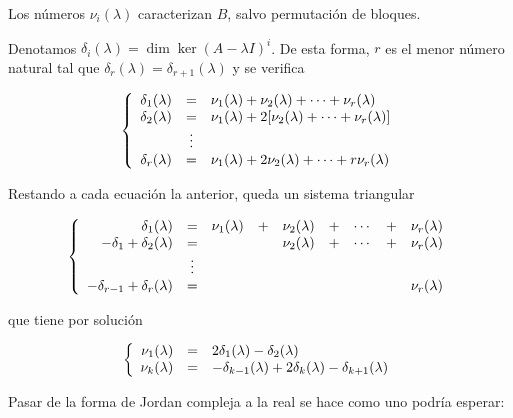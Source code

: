 \documentclass[../main.tex]{subfiles}
\begin{document}
  \begin{remark}
    Los números \(\nu_i(\lambda)\) caracterizan \(B\), salvo permutación de bloques.
  \end{remark}
  
  Denotamos \(\delta_i(\lambda) = \dim \ker (A - \lambda I)^i\). De esta forma,
  \(r\) es el menor número natural tal que \(\delta_r(\lambda) =
  \delta_{r+1}(\lambda)\) y se verifica

  \[\left\{
      \begin{array}[ht]{r c l}
        \delta_1(\lambda) & = & \nu_1(\lambda) + \nu_2(\lambda) + \cdots +
                            \nu_r(\lambda) \\
        \delta_2(\lambda) & = & \nu_1(\lambda) + 2[\nu_2(\lambda) + \cdots +
                            \nu_r(\lambda)] \\
        & \vdots & \\
        \delta_r(\lambda) & = & \nu_1(\lambda) + 2\nu_2(\lambda) + \cdots + r\nu_r(\lambda)
      \end{array}
      \right.
    \]

    Restando a cada ecuación la anterior, queda un sistema triangular

  \[\left\{
      \begin{array}[ht]{r c c c c c c c c}
        \delta_1(\lambda) & = & \nu_1(\lambda) & + & \nu_2(\lambda) & + & \cdots & + & \nu_r(\lambda) \\
        -\delta_1 + \delta_2(\lambda) & = & & & \nu_2(\lambda) & + & \cdots & + & \nu_r(\lambda) \\
        & \vdots & \\
        -\delta_{r-1} + \delta_r(\lambda) & = & & & & & & & \nu_r(\lambda)
      \end{array}
      \right.
    \]

    que tiene por solución

    \[\left\{
        \begin{array}[ht]{r c l}
          \nu_1(\lambda) & = & 2\delta_1(\lambda) - \delta_2(\lambda) \\
          \nu_k(\lambda) & = & -\delta_{k-1}(\lambda) + 2\delta_k(\lambda) - \delta_{k+1}(\lambda)
        \end{array}
      \right.
    \]

    Pasar de la forma de Jordan compleja a la real se hace como uno podría
    esperar:
\end{document}

